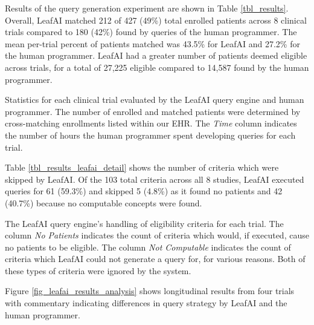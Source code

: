 \documentclass[../main.tex]{subfiles}
\begin{document}
Results of the query generation experiment are shown in Table \ref{tbl_results}. Overall, LeafAI matched 212 of 427 (49\%) total enrolled patients across 8 clinical trials compared to 180 (42\%) found by queries of the human programmer. The mean per-trial percent of patients matched was 43.5\% for LeafAI and 27.2\% for the human programmer. LeafAI had a greater number of patients deemed eligible across trials, for a total of 27,225 eligible compared to 14,587 found by the human programmer. 

\begin{table}[h!]
    \small
    \centering
    
    \caption{Statistics for each clinical trial evaluated by the LeafAI query engine and human programmer. The number of enrolled and matched patients were determined by cross-matching enrollments listed within our EHR. The \textit{Time} column indicates the number of hours the human programmer spent developing queries for each trial.}
    \label{tbl_results}
\end{table} 

Table \ref{tbl_results_leafai_detail} shows the number of criteria which were skipped by LeafAI. Of the 103 total criteria across all 8 studies, LeafAI executed queries for 61 (59.3\%) and skipped 5 (4.8\%) as it found no patients and 42 (40.7\%) because no computable concepts were found. 

\begin{table}[h!]
    \small
    \centering
    
    \caption{The LeafAI query engine's handling of eligibility criteria for each trial. The column \textit{No Patients} indicates the count of criteria which would, if executed, cause no patients to be eligible. The column \textit{Not Computable} indicates the count of criteria which LeafAI could not generate a query for, for various reasons. Both of these types of criteria were ignored by the system.}
    \label{tbl_results_leafai_detail}
\end{table} 

Figure \ref{fig_leafai_results_analysis} shows longitudinal results from four trials with commentary indicating differences in query strategy by LeafAI and the human programmer. 
\end{document}
